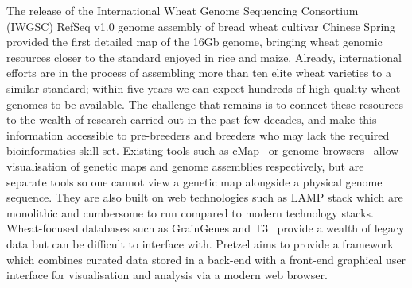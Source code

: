 \documentclass{bioinfo}
\begin{document}
The release of the International Wheat Genome Sequencing Consortium (IWGSC) RefSeq v1.0 genome assembly of bread wheat cultivar Chinese Spring~\citep{IWGSC2018} provided the first detailed map of the 16Gb genome, bringing wheat genomic resources closer to the standard enjoyed in rice and maize. 
Already, international efforts are in the process of assembling more than ten elite wheat varieties to a similar standard; within five years we can expect hundreds of high quality wheat genomes to be available. 
The challenge that remains is to connect these resources to the wealth of research carried out in the past few decades, and make this information accessible to pre-breeders and breeders who may lack the required bioinformatics skill-set.
Existing tools such as cMap~\citep{fang2003cmap} or genome browsers~\citep{Stein2013GBrowse,Buels2016JBrowse} allow visualisation of genetic maps and genome assemblies respectively, but are separate tools so one cannot view a genetic map alongside a physical genome sequence. 
They are also built on web technologies such as LAMP stack which are monolithic and cumbersome to run compared to modern technology stacks.  %
Wheat-focused databases such as GrainGenes and T3~\citep{Blake2016T3} provide a wealth of legacy data but can be difficult to interface with. 
Pretzel aims to provide a framework which combines curated data stored in a back-end with a front-end graphical user interface for visualisation and analysis via a modern web browser.
\end{document}
